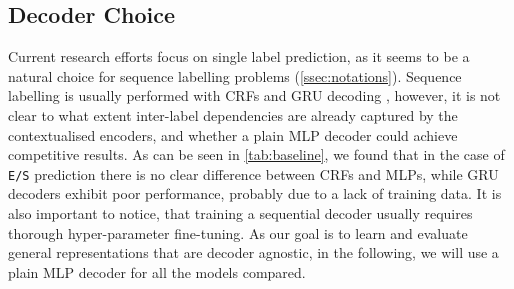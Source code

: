 \documentclass[11pt,a4paper]{article}
\begin{document}
\subsection{Decoder Choice}
Current research efforts focus on single label prediction, as it seems to be a natural choice for sequence labelling problems (\autoref{ssec:notations}).
Sequence labelling is usually performed with CRFs \cite{crf_chen, crf_kumar} and GRU decoding \cite{colombo2020guiding}, however, it is not clear to what extent inter-label dependencies are already captured by the contextualised encoders, and whether a plain MLP decoder could achieve competitive results.
As can be seen in \autoref{tab:baseline}, we found that in the case of \texttt{E/S} prediction there is no clear difference between CRFs and MLPs, while GRU decoders exhibit poor performance, probably due to a lack of training data.
It is also important to notice, that training a sequential decoder usually requires thorough hyper-parameter fine-tuning.
As our goal is to learn and evaluate general representations that are decoder agnostic, in the following, we will use a plain MLP decoder for all the models compared.
\begin{table}[]
\begin{center}
\caption{Experiments comparing decoder performances. Results are given on \texttt{SILICONE} for two types of baseline encoders (pre-trained BERT models and hierarchical recurrent encoders ).}\label{tab:baseline}
\end{center}
\end{table}
\end{document}
